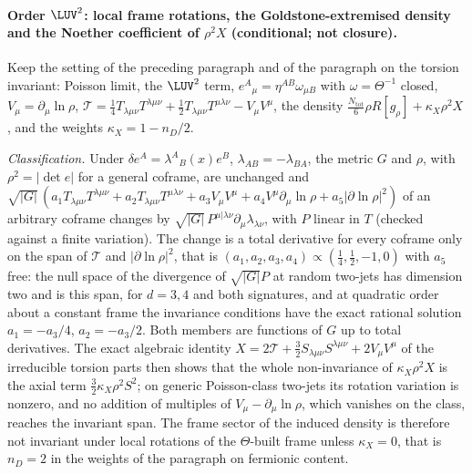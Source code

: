 \paragraph{Order \(\LUV^2\): local frame rotations, the Goldstone-extremised density and the Noether coefficient of \(\rho^2X\) (conditional; not closure).}
Keep the setting of the preceding paragraph and of the paragraph on the torsion invariant: Poisson limit, the \(\LUV^2\) term, \(e^A{}_\mu=\eta^{AB}\omega_{\mu B}\) with \(\omega=\Theta^{-1}\) closed, \(V_\mu=\partial_\mu\ln\rho\), \(\mathcal T=\tfrac14T_{\lambda\mu\nu}T^{\lambda\mu\nu}+\tfrac12T_{\lambda\mu\nu}T^{\mu\lambda\nu}-V_\mu V^\mu\), the density \(\tfrac{N_{\mathrm{tot}}}6\rho R[g_\rho]+\kappa_X\rho^2X\), and the weights \(\kappa_X=1-n_D/2\).

\emph{Classification.} Under \(\delta e^A=\lambda^A{}_B(x)e^B\), \(\lambda_{AB}=-\lambda_{BA}\), the metric \(G\) and \(\rho\), with \(\rho^2=\lvert\det e\rvert\) for a general coframe, are unchanged and \(\sqrt{\lvert G\rvert}\,(a_1T_{\lambda\mu\nu}T^{\lambda\mu\nu}+a_2T_{\lambda\mu\nu}T^{\mu\lambda\nu}+a_3V_\mu V^\mu+a_4V^\mu\partial_\mu\ln\rho+a_5\lvert\partial\ln\rho\rvert^2)\) of an arbitrary coframe changes by \(\sqrt{\lvert G\rvert}\,P^{\mu|\lambda\nu}\partial_\mu\lambda_{\lambda\nu}\), with \(P\) linear in \(T\) (checked against a finite variation). The change is a total derivative for every coframe only on the span of \(\mathcal T\) and \(\lvert\partial\ln\rho\rvert^2\), that is \((a_1,a_2,a_3,a_4)\propto(\tfrac14,\tfrac12,-1,0)\) with \(a_5\) free: the null space of the divergence of \(\sqrt{\lvert G\rvert}P\) at random two-jets has dimension two and is this span, for \(d=3,4\) and both signatures, and at quadratic order about a constant frame the invariance conditions have the exact rational solution \(a_1=-a_3/4\), \(a_2=-a_3/2\). Both members are functions of \(G\) up to total derivatives. The exact algebraic identity \(X=2\mathcal T+\tfrac32S_{\lambda\mu\nu}S^{\lambda\mu\nu}+2V_\mu V^\mu\) of the irreducible torsion parts then shows that the whole non-invariance of \(\kappa_X\rho^2X\) is the axial term \(\tfrac32\kappa_X\rho^2S^2\); on generic Poisson-class two-jets its rotation variation is nonzero, and no addition of multiples of \(V_\mu-\partial_\mu\ln\rho\), which vanishes on the class, reaches the invariant span. The frame sector of the induced density is therefore not invariant under local rotations of the \(\Theta\)-built frame unless \(\kappa_X=0\), that is \(n_D=2\) in the weights of the paragraph on fermionic content.

